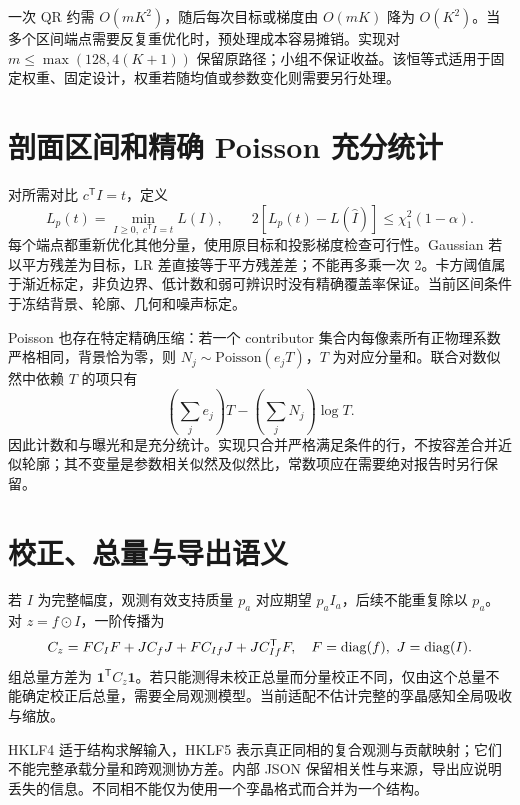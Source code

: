 一次 QR 约需 $O(mK^2)$，随后每次目标或梯度由 $O(mK)$ 降为 $O(K^2)$。当多个区间端点需要反复重优化时，预处理成本容易摊销。实现对 $m\le\max(128,4(K+1))$ 保留原路径；小组不保证收益。该恒等式适用于固定权重、固定设计，权重若随均值或参数变化则需要另行处理。
\section{剖面区间和精确 Poisson 充分统计}
对所需对比 $c^{\mathsf T}I=t$，定义
\begin{equation}
L_p(t)=\min_{I\ge0,\;c^{\mathsf T}I=t}L(I),\qquad
2[L_p(t)-L(\widehat I)]\le\chi^2_1(1-\alpha).
\end{equation}
每个端点都重新优化其他分量，使用原目标和投影梯度检查可行性。Gaussian 若以平方残差为目标，LR 差直接等于平方残差差；不能再多乘一次 2。卡方阈值属于渐近标定，非负边界、低计数和弱可辨识时没有精确覆盖率保证。当前区间条件于冻结背景、轮廓、几何和噪声标定。

Poisson 也存在特定精确压缩：若一个 contributor 集合内每像素所有正物理系数严格相同，背景恰为零，则 $N_j\sim\mathrm{Poisson}(e_jT)$，$T$ 为对应分量和。联合对数似然中依赖 $T$ 的项只有
\begin{equation}
\left(\sum_je_j\right)T-\left(\sum_jN_j\right)\log T.
\end{equation}
因此计数和与曝光和是充分统计。实现只合并严格满足条件的行，不按容差合并近似轮廓；其不变量是参数相关似然及似然比，常数项应在需要绝对报告时另行保留。
\section{校正、总量与导出语义}
若 $I$ 为完整幅度，观测有效支持质量 $p_a$ 对应期望 $p_aI_a$，后续不能重复除以 $p_a$。对 $z=f\odot I$，一阶传播为
\begin{equation}
C_z=FC_IF+JC_fJ+FC_{If}J+JC_{If}^{\mathsf T}F,
\quad F=\operatorname{diag}(f),\ J=\operatorname{diag}(I).
\end{equation}
组总量方差为 $\mathbf1^{\mathsf T}C_z\mathbf1$。若只能测得未校正总量而分量校正不同，仅由这个总量不能确定校正后总量，需要全局观测模型。当前适配不估计完整的孪晶感知全局吸收与缩放。

HKLF4 适于结构求解输入，HKLF5 表示真正同相的复合观测与贡献映射；它们不能完整承载分量和跨观测协方差。内部 JSON 保留相关性与来源，导出应说明丢失的信息。不同相不能仅为使用一个孪晶格式而合并为一个结构。
